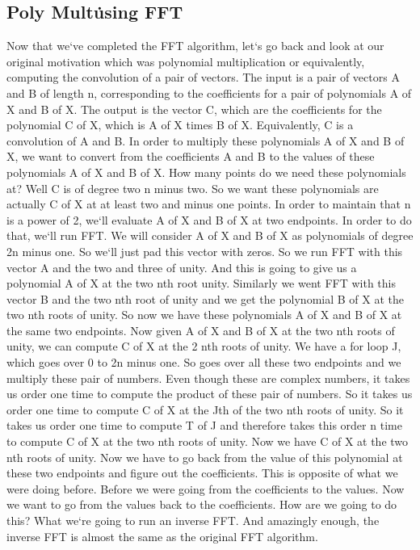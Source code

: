 \subsection{Poly Mult\. using FFT}
Now that we`ve completed the FFT algorithm, let`s go back and look at our original motivation which was polynomial multiplication or equivalently, computing the convolution of a pair of vectors.
The input is a pair of vectors A and B of length n, corresponding to the coefficients for a pair of polynomials A of X and B of X\@.
The output is the vector C, which are the coefficients for the polynomial C of X, which is A of X times B of X\@.
Equivalently, C is a convolution of A and B\@.
In order to multiply these polynomials A of X and B of X, we want to convert from the coefficients A and B to the values of these polynomials A of X and B of X\@.
How many points do we need these polynomials at? Well C is of degree two n minus two.
So we want these polynomials are actually C of X at at least two and minus one points.
In order to maintain that n is a power of 2, we`ll evaluate A of X and B of X at two endpoints.
In order to do that, we`ll run FFT\@.
We will consider A of X and B of X as polynomials of degree 2n minus one.
So we`ll just pad this vector with zeros.
So we run FFT with this vector A and the two and three of unity.
And this is going to give us a polynomial A of X at the two nth root unity.
Similarly we went FFT with this vector B and the two nth root of unity and we get the polynomial B of X at the two nth roots of unity.
So now we have these polynomials A of X and B of X at the same two endpoints.
Now given A of X and B of X at the two nth roots of unity, we can compute C of X at the 2 nth roots of unity.
We have a for loop J, which goes over 0 to 2n minus one.
So goes over all these two endpoints and we multiply these pair of numbers.
Even though these are complex numbers, it takes us order one time to compute the product of these pair of numbers.
So it takes us order one time to compute C of X at the Jth of the two nth roots of unity.
So it takes us order one time to compute T of J and therefore takes this order n time to compute C of X at the two nth roots of unity.
Now we have C of X at the two nth roots of unity.
Now we have to go back from the value of this polynomial at these two endpoints and figure out the coefficients.
This is opposite of what we were doing before.
Before we were going from the coefficients to the values.
Now we want to go from the values back to the coefficients.
How are we going to do this? What we`re going to run an inverse FFT\@.
And amazingly enough, the inverse FFT is almost the same as the original FFT algorithm.


